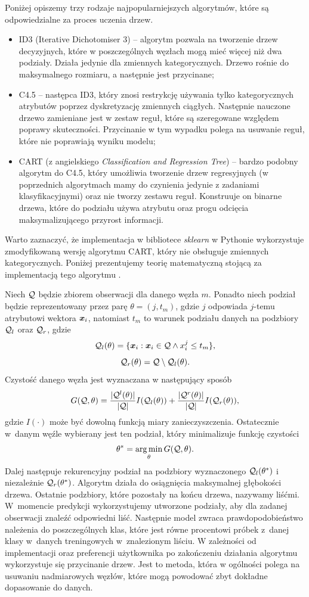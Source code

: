\documentclass[inzynierska]{pwr_wmat_praca_dyplomowa}
\theoremstyle{plain}
\numberwithin{theorem}{chapter}
\theoremstyle{definition}
\numberwithin{theorem}{chapter}
\DeclareMathOperator*{\argmin}{arg\,min}
\begin{document}
Poniżej opiszemy trzy rodzaje najpopularniejszych algorytmów, które są odpowiedzialne za proces uczenia drzew.
\begin{itemize}
	\item ID3 (Iterative Dichotomiser 3) -- algorytm pozwala na tworzenie drzew decyzyjnych, które w poszczególnych węzłach mogą mieć więcej niż dwa podziały. Działa jedynie dla zmiennych kategorycznych. Drzewo rośnie do maksymalnego rozmiaru, a następnie jest przycinane;
	\item C4.5 -- następca ID3, który znosi restrykcję używania tylko kategorycznych atrybutów poprzez dyskretyzację zmiennych ciągłych. Następnie nauczone drzewo zamieniane jest w zestaw reguł, które są szeregowane względem poprawy skuteczności. Przycinanie w tym wypadku polega na usuwanie reguł, które nie poprawiają wyniku modelu;
	\item CART (z angielskiego \textit{Classification and Regression Tree}) -- bardzo podobny algorytm do C4.5, który umożliwia tworzenie drzew regresyjnych (w poprzednich algorytmach mamy do czynienia jedynie z zadaniami klasyfikacyjnymi) oraz nie tworzy zestawu reguł. Konstruuje on binarne drzewa, które do podziału używa atrybutu oraz progu odcięcia maksymalizującego przyrost informacji.
\end{itemize}
Warto zaznaczyć, że implementacja w bibliotece \textit{sklearn} w Pythonie wykorzystuje zmodyfikowaną wersję algorytmu CART, który nie obsługuje zmiennych kategorycznych. Poniżej prezentujemy teorię matematyczną stojącą za implementacją tego algorytmu \cite{sklearn_api}.

Niech $\mathcal{Q}$ będzie zbiorem obserwacji dla danego węzła $m$. Ponadto niech podział będzie reprezentowany przez parę $\theta = (j, t_m)$, gdzie $j$ odpowiada $j$-temu atrybutowi wektora $\boldsymbol{x}_i$, natomiast $t_m$ to warunek podziału danych na podzbiory $\mathcal{Q}_l$ oraz $\mathcal{Q}_r$, gdzie
$$ \mathcal{Q}_l (\theta) = \{ \boldsymbol{x}_i : \boldsymbol{x}_i \in \mathcal{Q} \land x^{j}_i \leq t_m \} \text{,} $$
$$ \mathcal{Q}_r (\theta) = \mathcal{Q} \setminus \mathcal{Q}_l(\theta) \text{.} $$
Czystość danego węzła jest wyznaczana w następujący sposób
$$ G(\mathcal{Q}, \theta) = \frac{|\mathcal{Q}^l (\theta)|}{|\mathcal{Q}|} I(\mathcal{Q}_l (\theta)) + \frac{|\mathcal{Q}^r (\theta)|}{|\mathcal{Q}|} I(\mathcal{Q}_r (\theta)) \text{,}$$
gdzie $I(\cdot)$ może być dowolną funkcją miary zanieczyszczenia. Ostatecznie w~danym węźle wybierany jest ten podział, który minimalizuje funkcję czystości
$$ \theta^* = \argmin_\theta G(\ku, \theta) \text{.}$$
Dalej następuje rekurencyjny podział na podzbiory wyznaczonego $\mathcal{Q}_l (\theta^*)$ i niezależnie $\mathcal{Q}_r (\theta^*)$. Algorytm działa do osiągnięcia maksymalnej głębokości drzewa. Ostatnie podzbiory, które pozostały na końcu drzewa, nazywamy liśćmi. 
W~momencie predykcji wykorzystujemy utworzone podziały, aby dla zadanej obserwacji znaleźć odpowiedni liść. Następnie model zwraca prawdopodobieństwo należenia do poszczególnych klas, które jest równe procentowi próbek z~danej klasy w~danych treningowych w~znalezionym liściu.
W zależności od implementacji oraz preferencji użytkownika po zakończeniu działania algorytmu wykorzystuje się przycinanie drzew. Jest to metoda, która w ogólności polega na usuwaniu nadmiarowych węzłów, które mogą powodować zbyt dokładne dopasowanie do danych. 
\end{document}
